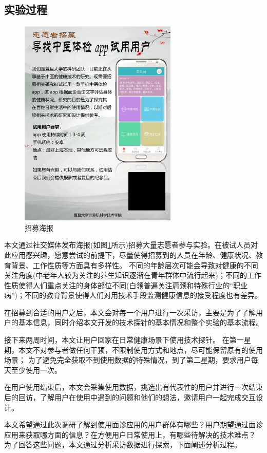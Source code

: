 \subsection{实验过程}
\begin{figure}[ht]
    \centering
    \includegraphics[height=10cm]{images/poster.png}
    \caption{招募海报}
    \label{fig:poster}
\end{figure}

本文通过社交媒体发布海报(如图\ref{fig:poster}所示)招募大量志愿者参与实验。在被试人员对此应用感兴趣，愿意尝试的前提下，尽量使得招募到的人员在年龄、健康状况、教育背景、工作性质等方面具有多样性。
不同的年龄层次可能会导致对健康的不同关注角度(中老年人较为关注的养生知识逐渐在青年群体中流行起来)；不同的工作性质使得人们重点关注的身体部位不同(白领普遍关注肩颈和特殊行业的“职业病”)；不同的教育背景使得人们对用技术手段监测健康信息的接受程度也有差异。

在招募到合适的用户之后，本文会对每一个用户进行一次采访，主要是为了了解用户的基本信息，同时介绍本文开发的技术探针的基本情况和整个实验的基本流程。

接下来两周时间，本文让用户回家在日常健康场景下使用技术探针。
在第一星期，本文不对参与者做任何干预，不限制使用方式和地点，尽可能保留原有的使用场景；
为了避免完全获取不到使用数据的特殊情况，到了第二星期，要求用户每天至少使用一次。

在用户使用结束后，本文会采集使用数据，挑选出有代表性的用户并进行一次结束后的回访，了解用户在使用中遇到的问题和他们的想法，邀请用户一起完成交互设计。


本文希望通过此次调研了解到使用面诊应用的用户群体有哪些？用户期望通过面诊应用来获取哪方面的信息？在方便用户日常使用上，有哪些待解决的技术难点？
为了回答这些问题，本文通过分析采访数据进行探索，下面阐述分析过程。

